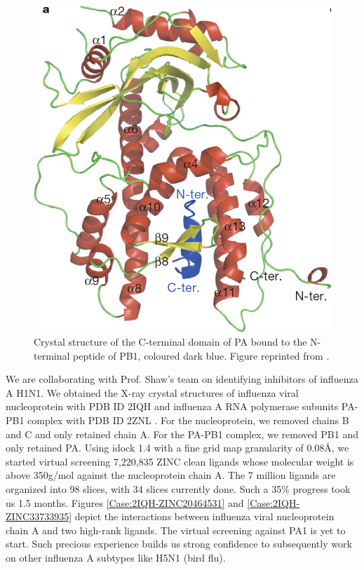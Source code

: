 \begin{figure}
\centering
\includegraphics[width=\linewidth]{Case/InfluenzaPAPB1.png}
\caption{Crystal structure of the C-terminal domain of PA bound to the N-terminal peptide of PB1, coloured dark blue. Figure reprinted from \citep{1141}.}
\label{Case:InfluenzaPAPB1}
\end{figure}

We are collaborating with Prof. Shaw's team on identifying inhibitors of influenza A H1N1. We obtained the X-ray crystal structures of influenza viral nucleoprotein with PDB ID 2IQH \citep{1140} and influenza A RNA polymerase subunits PA-PB1 complex with PDB ID 2ZNL \citep{1141}. For the nucleoprotein, we removed chains B and C and only retained chain A. For the PA-PB1 complex, we removed PB1 and only retained PA. Using idock 1.4 with a fine grid map granularity of 0.08\AA, we started virtual screening 7,220,835 ZINC \citep{532} clean ligands whose molecular weight is above 350g/mol against the nucleoprotein chain A. The 7 million ligands are organized into 98 slices, with 34 slices currently done. Such a 35\% progress took us 1.5 months. Figures \ref{Case:2IQH-ZINC20464531} and \ref{Case:2IQH-ZINC33733935} depict the interactions between influenza viral nucleoprotein chain A and two high-rank ligands. The virtual screening against PA1 is yet to start. Such precious experience builds us strong confidence to subsequently work on other influenza A subtypes like H5N1 (bird flu).


